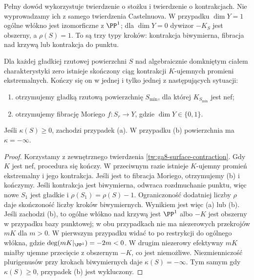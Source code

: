 \begin{uwaga}
Pełny dowód wykorzystuje twierdzenie o stożku i twierdzenie
o kontrakcjach. Nie wyprowadzamy ich z samego twierdzenia
Castelnuova. W przypadku $\dim Y=1$ ogólne włókno
jest izomorficzne z $\PP^1$; dla $\dim Y=0$ dywizor
$-K_S$ jest obszerny, a $\rho(S)=1$.
To są trzy typy kroków: kontrakcja biwymierna,
fibracja nad krzywą lub kontrakcja do punktu.
\end{uwaga}

\begin{twierdzenie}
\label{tw:ga8-surface-mmp}
Dla każdej gładkiej rzutowej powierzchni $S$
nad algebraicznie domkniętym ciałem charakterystyki zero
istnieje skończony ciąg kontrakcji $K$-ujemnych
promieni ekstremalnych. Kończy się on w jednej
i tylko jednej z następujących sytuacji:
\begin{enumerate}[label=(\alph*)]
\item otrzymujemy gładką rzutową powierzchnię $S_{\min}$,
dla której $K_{S_{\min}}$ jest nef;
\item otrzymujemy fibrację Moriego $f:S_r\to Y$,
gdzie $\dim Y\in\{0,1\}$.
\end{enumerate}
Jeśli $\kappa(S)\ge0$, zachodzi przypadek (a).
W przypadku (b) powierzchnia ma $\kappa=-\infty$.
\end{twierdzenie}
\begin{proof}
Korzystamy z zewnętrznego twierdzenia
\ref{tw:ga8-surface-contraction}. Gdy $K$ jest nef,
procedura się kończy. W przeciwnym razie istnieje
$K$-ujemny promień ekstremalny i jego kontrakcja.
Jeśli jest to fibracja Moriego, otrzymujemy (b)
i kończymy. Jeśli kontrakcja jest biwymierna,
odwraca rozdmuchanie punktu, więc nowe $S_1$
jest gładkie i $\rho(S_1)=\rho(S)-1$.
Ograniczoność dodatniej liczby $\rho$ daje skończoność
liczby kroków biwymiernych. Wynikiem jest więc
(a) lub (b). Jeśli zachodzi (b), to ogólne włókno
nad krzywą jest $\PP^1$ albo $-K$ jest obszerny
w przypadku bazy punktowej; w obu przypadkach
nie ma niezerowych przekrojów $mK$ dla $m>0$.
W pierwszym przypadku widać to po restrykcji
do ogólnego włókna, gdzie
$\deg(mK|_{\PP^1})=-2m<0$.
W drugim niezerowy efektywny $mK$ miałby
ujemne przecięcie z obszernym $-K$, co jest
niemożliwe. Niezmienniczość plurigenusów przy
krokach biwymiernych daje $\kappa(S)=-\infty$.
Tym samym gdy $\kappa(S)\ge0$, przypadek (b)
jest wykluczony.
\end{proof}

